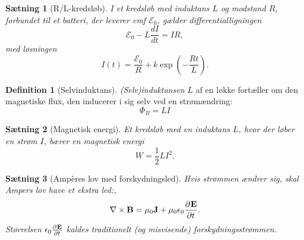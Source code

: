 \documentclass[]{article}
\newtheorem{theorem}{Sætning}
\theoremstyle{definition}
\newtheorem{definition}{Definition}
\begin{document}
\begin{theorem}[R/L-kredsløb]
	I et kredsløb med induktans $L$ og modstand $R$, forbundet til et batteri, der leverer emf $\mathcal{E}_0$, gælder differentialligningen
	\begin{equation*}
		\mathcal{E}_0 - L\frac{d I}{dt} = IR,
	\end{equation*}
	med løsningen
	\begin{equation*}
		I(t) = \dfrac{\mathcal{E}_0}{R} + k \exp(-\frac{Rt}{L}).
	\end{equation*}
\end{theorem}

\begin{definition}[Selvinduktans]
	\emph{(Selv)induktansen} $L$ af en løkke fortæller om den magnetiske flux, den inducerer i sig selv ved en strømændring:
	\begin{equation*}
		\Phi_B = LI
	\end{equation*}
\end{definition}

\begin{theorem}[Magnetisk energi]
	Et kredsløb med en induktans $L$, hvor der løber en strøm $I$, bærer en magnetisk energi
	\begin{equation*}
		W = \dfrac{1}{2} LI^2.
	\end{equation*}
\end{theorem}

\begin{theorem}[Ampères lov med forskydningsled]
	Hvis strømmen ændrer sig, skal Ampers lov have et ekstra led:,
	\begin{equation*}
		\nabla \times \mathbf{B} = \mu_0 \mathbf{J} + \mu_0 \epsilon_0 \frac{\partial^{} \mathbf{E}}{\partial t ^{}}.
	\end{equation*}
	Størrelsen $ \epsilon_0 \frac{\partial^{} \mathbf{E}}{\partial t ^{}}$ kaldes traditionelt (og misvisende) \emph{forskydningsstrømmen}.
\end{theorem}


\newpage
\end{document}
